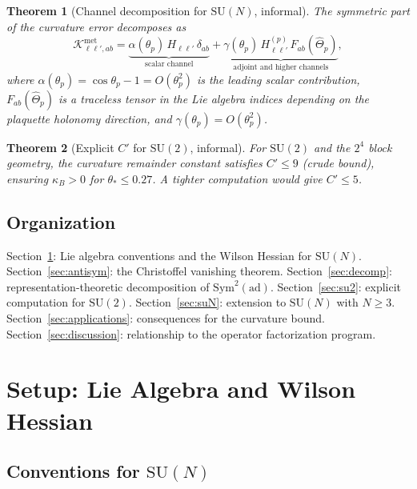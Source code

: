 \documentclass[11pt,a4paper]{article}
\theoremstyle{plain}
\newtheorem{theorem}{Theorem}[section]
\theoremstyle{definition}
\theoremstyle{remark}
\newcommand{\SU}{\mathrm{SU}}
\newcommand{\ad}{\mathrm{ad}}
\newcommand{\Sym}{\mathrm{Sym}}
\newcommand{\cK}{\mathcal{K}}
\begin{document}
\begin{theorem}[Channel decomposition for $\SU(N)$, informal]\label{thm:B-informal}
The symmetric part of the curvature error decomposes as
\begin{equation}
\cK^{\mathrm{met}}_{\ell\ell',ab}
= \underbrace{\alpha(\theta_p)\,H_{\ell\ell'}\,\delta_{ab}}_{\text{scalar channel}}
+ \underbrace{\gamma(\theta_p)\,H_{\ell\ell'}^{(p)}\,
F_{ab}(\hat\Theta_p)}_{\text{adjoint and higher channels}},
\end{equation}
where $\alpha(\theta_p) = \cos\theta_p - 1 = O(\theta_p^2)$ is
the leading scalar contribution,
$F_{ab}(\hat\Theta_p)$ is a traceless tensor in the Lie algebra
indices depending on the plaquette holonomy direction, and
$\gamma(\theta_p) = O(\theta_p^2)$.
\end{theorem}

\begin{theorem}[Explicit $C'$ for $\SU(2)$, informal]\label{thm:C-informal}
For $\SU(2)$ and the $2^4$ block geometry, the curvature
remainder constant satisfies $C' \leq 9$ (crude bound), ensuring
$\kappa_B > 0$ for $\theta_* \leq 0.27$. A tighter computation
would give $C' \leq 5$.
\end{theorem}


\subsection{Organization}

Section~\ref{sec:setup}: Lie algebra conventions and the Wilson
Hessian for $\SU(N)$.
Section~\ref{sec:antisym}: the Christoffel vanishing theorem.
Section~\ref{sec:decomp}: representation-theoretic decomposition
of $\Sym^2(\ad)$.
Section~\ref{sec:su2}: explicit computation for $\SU(2)$.
Section~\ref{sec:suN}: extension to $\SU(N)$ with $N \geq 3$.
Section~\ref{sec:applications}: consequences for the curvature
bound.
Section~\ref{sec:discussion}: relationship to the operator
factorization program.


\section{Setup: Lie Algebra and Wilson Hessian}\label{sec:setup}

\subsection{Conventions for $\SU(N)$}
\end{document}
